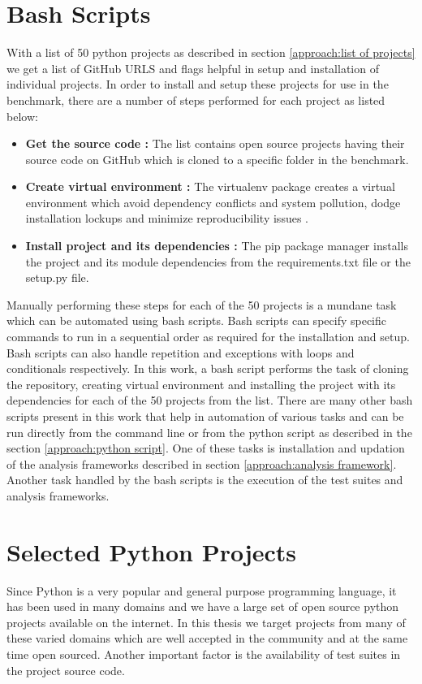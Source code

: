 \section{Bash Scripts}
\label{approach:bash scripts}
With a list of 50 python projects as described in section \ref{approach:list of projects} we get a list of GitHub URLS and flags helpful in setup and installation of individual projects. In order to install and setup these projects for use in the benchmark, there are a number of steps performed for each project as listed below:
\begin{itemize}
    \item \textbf{Get the source code :} The list contains open source projects having their source code on GitHub which is cloned to a specific folder in the benchmark. 
    \item \textbf{Create virtual environment :} The virtualenv \cite{virtualenv} package creates a virtual environment which avoid dependency conflicts and system pollution, dodge installation lockups and minimize reproducibility issues \cite{Why_Virtual_Env}.
    \item \textbf{Install project and its dependencies :} The pip package manager \cite{pip_package_manager} installs the project and its module dependencies from the requirements.txt file or the setup.py file.
\end{itemize}
Manually performing these steps for each of the 50 projects is a mundane task which can be automated using bash scripts. Bash scripts can specify specific commands to run in a sequential order as required for the installation and setup. Bash scripts can also handle repetition and exceptions with loops and conditionals respectively. In this work, a bash script performs the task of cloning the repository, creating virtual environment and installing the project with its dependencies for each of the 50 projects from the list. There are many other bash scripts present in this work that help in automation of various tasks and can be run directly from the command line or from the python script as described in the section \ref{approach:python script}. One of these tasks is installation and updation of the analysis frameworks described in section \ref{approach:analysis framework}. Another task handled by the bash scripts is the execution of the test suites and analysis frameworks.

\section{Selected Python Projects}
\label{approach:selection of projects}
Since Python is a very popular and general purpose programming language, it has been used in many domains and we have a large set of open source python projects available on the internet. In this thesis we target projects from many of these varied domains which are well accepted in the community and at the same time open sourced. Another important factor is the availability of test suites in the project source code. 

